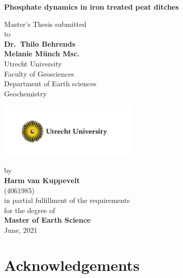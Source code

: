 \documentclass[a4paper,11pt]{article}
\begin{document}
\thispagestyle{empty}
\begin{center}
  {\Large{\bf Phosphate dynamics in iron treated peat ditches}} \vspace{0.5cm}

  Master's Thesis submitted \\\vspace{0.5cm}
  to \\\vspace{0.5cm}
  \textbf{Dr.~Thilo Behrends} \\
  \textbf{Melanie Münch Msc.} \\\vspace{0.5cm}
  Utrecht University \\
  Faculty of Geosciences \\
  Department of Earth sciences \\
   Geochemistry \\  \vspace{1cm}

  \includegraphics[width=0.5\textwidth]{UU_logo_EN_CMYK.png}
  
  by \\\vspace{0.5cm}
  \textbf{Harm van Kuppevelt} \\
  (4061985) \\
  
  \medskip
  \medskip
  in partial fulfillment of the requirements \\
  for the degree of \\
  \textbf{Master of Earth Science} \\\vspace{0.5cm}
  June, 2021
  
\end{center}
\newpage
\hypertarget{acknowledgements}{%
\section*{Acknowledgements}\label{acknowledgements}}
\end{document}
